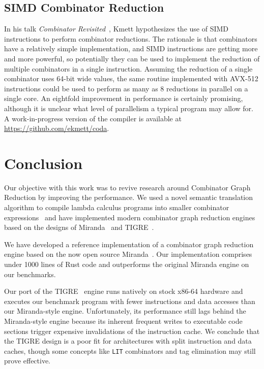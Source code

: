 \documentclass[conference]{IEEEtran}
\begin{document}
\subsection{SIMD Combinator Reduction}
In his talk \emph{Combinator Revisited}~\cite{kmett_combinators_2018}, Kmett hypothesizes the use of SIMD instructions to perform combinator reductions.
The rationale is that combinators have a relatively simple implementation, and SIMD instructions are getting more and more powerful, so potentially they can be used to implement the reduction of multiple combinators in a single instruction.
Assuming the reduction of a single combinator uses 64-bit wide values, the same routine implemented with AVX-512 instructions could be used to perform as many as 8 reductions in parallel on a single core.
An eightfold improvement in performance is certainly promising, although it is unclear what level of parallelism a typical program may allow for.
A work-in-progress version of the compiler is available at \url{https://github.com/ekmett/coda}.

\section{Conclusion}
Our objective with this work was to revive research around Combinator Graph Reduction by improving the performance.
We used a novel semantic translation algorithm to compile lambda calculus programs into smaller combinator expressions~\cite{kiselyov_lambda_2018} and have implemented modern combinator graph reduction engines based on the designs of Miranda~\cite{turner_new_1979} and TIGRE~\cite{koopman_fresh_1989}.

We have developed a reference implementation of a combinator graph reduction engine based on the now open source Miranda~\cite{turner_new_1979}.
Our implementation comprises under 1000 lines of Rust code and outperforms the original Miranda engine on our benchmarks.

Our port of the TIGRE~\cite{koopman_fresh_1989} engine runs natively on stock x86-64 hardware and executes our benchmark program with fewer instructions and data accesses than our Miranda-style engine.
Unfortunately, its performance still lags behind the Miranda-style engine because its inherent frequent writes to executable code sections trigger expensive invalidations of the instruction cache.
We conclude that the TIGRE design is a poor fit for architectures with split instruction and data caches, though some concepts like \texttt{LIT} combinators and tag elimination may still prove effective.
\end{document}
